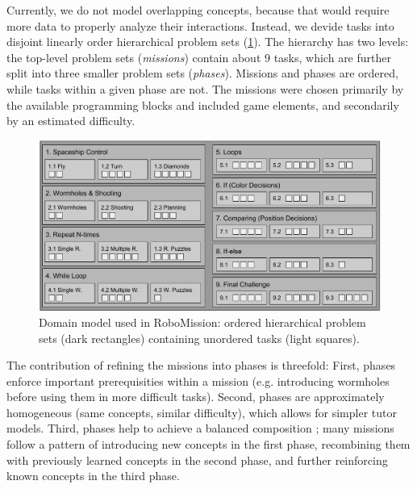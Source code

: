 Currently, we do not model overlapping concepts, because that would require
more data to properly analyze their interactions.
Instead, we devide tasks into disjoint linearly order hierarchical problem
sets (\cref{fig:robomission.domain}). %
The hierarchy has two levels: the top-level problem sets (\emph{missions})
contain about 9 tasks, which are further split into three smaller
problem sets (\emph{phases}).
Missions and phases are ordered, while tasks within a given phase are not.
The missions were chosen primarily by the available programming blocks and
included game elements, and secondarily by an estimated difficulty.

\begin{figure}[htb]
\centering
\includegraphics[width=\textwidth]{img/robomission-domain}
\caption{%
  Domain model used in RoboMission: ordered hierarchical problem sets (dark rectangles)
  containing unordered tasks (light squares).}
\label{fig:robomission.domain}
\end{figure}

The contribution of refining the missions into phases is threefold:
First, phases enforce important prerequisities within a mission (e.g.
introducing wormholes before using them in more difficult tasks).
Second, phases are approximately homogeneous (same concepts, similar difficulty),
which allows for simpler tutor models.
Third, phases help to achieve a balanced composition \cite{progression-analysis};
  many missions follow a pattern of
  introducing new concepts in the first phase,
  recombining them with previously learned concepts in the second phase,
  and further reinforcing known concepts in the third phase. %



